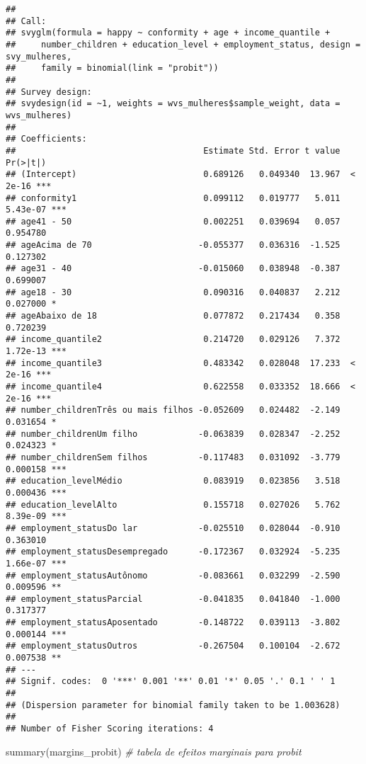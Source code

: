 \documentclass[
]{article}
\newenvironment{Shaded}{\begin{snugshade}}{\end{snugshade}}
\newcommand{\CommentTok}[1]{\textcolor[rgb]{0.56,0.35,0.01}{\textit{#1}}}
\newcommand{\FunctionTok}[1]{\textcolor[rgb]{0.00,0.00,0.00}{#1}}
\newcommand{\NormalTok}[1]{#1}
\begin{document}
\begin{verbatim}
## 
## Call:
## svyglm(formula = happy ~ conformity + age + income_quantile + 
##     number_children + education_level + employment_status, design = svy_mulheres, 
##     family = binomial(link = "probit"))
## 
## Survey design:
## svydesign(id = ~1, weights = wvs_mulheres$sample_weight, data = wvs_mulheres)
## 
## Coefficients:
##                                     Estimate Std. Error t value Pr(>|t|)    
## (Intercept)                         0.689126   0.049340  13.967  < 2e-16 ***
## conformity1                         0.099112   0.019777   5.011 5.43e-07 ***
## age41 - 50                          0.002251   0.039694   0.057 0.954780    
## ageAcima de 70                     -0.055377   0.036316  -1.525 0.127302    
## age31 - 40                         -0.015060   0.038948  -0.387 0.699007    
## age18 - 30                          0.090316   0.040837   2.212 0.027000 *  
## ageAbaixo de 18                     0.077872   0.217434   0.358 0.720239    
## income_quantile2                    0.214720   0.029126   7.372 1.72e-13 ***
## income_quantile3                    0.483342   0.028048  17.233  < 2e-16 ***
## income_quantile4                    0.622558   0.033352  18.666  < 2e-16 ***
## number_childrenTrês ou mais filhos -0.052609   0.024482  -2.149 0.031654 *  
## number_childrenUm filho            -0.063839   0.028347  -2.252 0.024323 *  
## number_childrenSem filhos          -0.117483   0.031092  -3.779 0.000158 ***
## education_levelMédio                0.083919   0.023856   3.518 0.000436 ***
## education_levelAlto                 0.155718   0.027026   5.762 8.39e-09 ***
## employment_statusDo lar            -0.025510   0.028044  -0.910 0.363010    
## employment_statusDesempregado      -0.172367   0.032924  -5.235 1.66e-07 ***
## employment_statusAutônomo          -0.083661   0.032299  -2.590 0.009596 ** 
## employment_statusParcial           -0.041835   0.041840  -1.000 0.317377    
## employment_statusAposentado        -0.148722   0.039113  -3.802 0.000144 ***
## employment_statusOutros            -0.267504   0.100104  -2.672 0.007538 ** 
## ---
## Signif. codes:  0 '***' 0.001 '**' 0.01 '*' 0.05 '.' 0.1 ' ' 1
## 
## (Dispersion parameter for binomial family taken to be 1.003628)
## 
## Number of Fisher Scoring iterations: 4
\end{verbatim}

\begin{Shaded}
\begin{Highlighting}[]
\FunctionTok{summary}\NormalTok{(margins\_probit) }\CommentTok{\# tabela de efeitos marginais para probit}
\end{Highlighting}
\end{Shaded}
\end{document}
